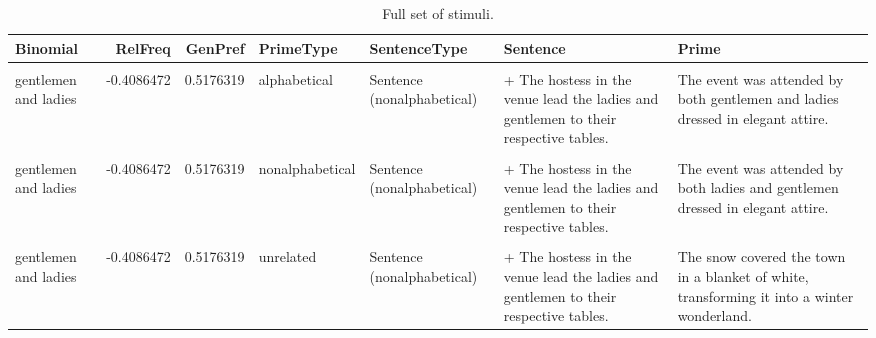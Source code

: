 \documentclass[
  12pt,
]{scrartcl}
\begin{document}
\begin{landscape}

\begingroup\fontsize{6}{8}\selectfont

\begin{longtable}{lrrllll}

\caption{\label{tbl-appendixstimuli}Full set of stimuli.}

\tabularnewline

\toprule
\textbf{Binomial} & \textbf{RelFreq} & \textbf{GenPref} & \textbf{PrimeType} & \textbf{SentenceType} & \textbf{Sentence} & \textbf{Prime}\\
\midrule
\cellcolor{gray!6}{gentlemen and ladies} & \cellcolor{gray!6}{-0.4086472} & \cellcolor{gray!6}{0.5176319} & \cellcolor{gray!6}{alphabetical} & \cellcolor{gray!6}{Sentence (alphabetical)} & \cellcolor{gray!6}{+ The hostess in the venue lead the gentlemen and ladies to their respective tables.} & \cellcolor{gray!6}{The event was attended by both gentlemen and ladies dressed in elegant attire.}\\
gentlemen and ladies & -0.4086472 & 0.5176319 & alphabetical & Sentence (nonalphabetical) & + The hostess in the venue lead the ladies and gentlemen to their respective tables. & The event was attended by both gentlemen and ladies dressed in elegant attire.\\
\cellcolor{gray!6}{gentlemen and ladies} & \cellcolor{gray!6}{-0.4086472} & \cellcolor{gray!6}{0.5176319} & \cellcolor{gray!6}{nonalphabetical} & \cellcolor{gray!6}{Sentence (alphabetical)} & \cellcolor{gray!6}{+ The hostess in the venue lead the gentlemen and ladies to their respective tables.} & \cellcolor{gray!6}{The event was attended by both ladies and gentlemen dressed in elegant attire.}\\
gentlemen and ladies & -0.4086472 & 0.5176319 & nonalphabetical & Sentence (nonalphabetical) & + The hostess in the venue lead the ladies and gentlemen to their respective tables. & The event was attended by both ladies and gentlemen dressed in elegant attire.\\
\cellcolor{gray!6}{gentlemen and ladies} & \cellcolor{gray!6}{-0.4086472} & \cellcolor{gray!6}{0.5176319} & \cellcolor{gray!6}{unrelated} & \cellcolor{gray!6}{Sentence (alphabetical)} & \cellcolor{gray!6}{+ The hostess in the venue lead the gentlemen and ladies to their respective tables.} & \cellcolor{gray!6}{The snow covered the town in a blanket of white, transforming it into a winter wonderland.}\\
\addlinespace
gentlemen and ladies & -0.4086472 & 0.5176319 & unrelated & Sentence (nonalphabetical) & + The hostess in the venue lead the ladies and gentlemen to their respective tables. & The snow covered the town in a blanket of white, transforming it into a winter wonderland.\\

\end{longtable}
\end{landscape}
\end{document}
